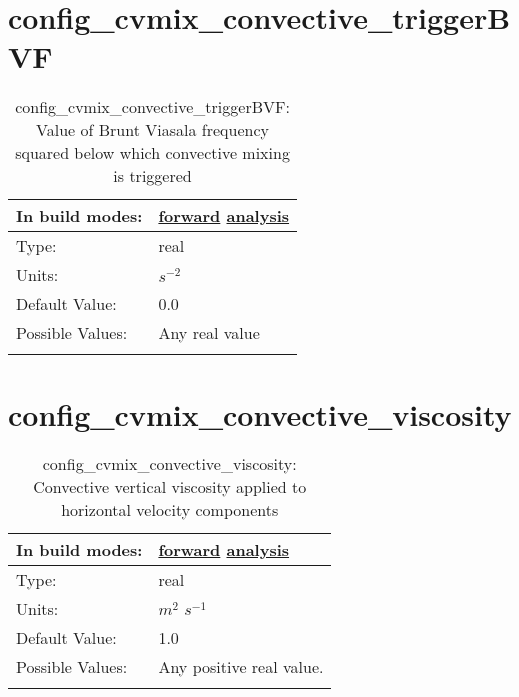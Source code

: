 \section[config\_cvmix\_convective\_triggerBVF]{config\_cvmix\_convective\_triggerBVF}
\label{sec:nm_sec_config_cvmix_convective_triggerBVF}
\begin{center}
\begin{longtable}{| p{2.0in} || p{4.0in} |}
    \hline
    In build modes: & \hyperref[subsec:forward_nm_tab_cvmix]{forward} \hyperref[subsec:analysis_nm_tab_cvmix]{analysis} \\
    \hline
    Type: & real \\
    \hline
    Units: & $s^{-2}$ \\
    \hline
    Default Value: & 0.0 \\
    \hline
    Possible Values: & Any real value \\
    \hline
    \caption{config\_cvmix\_convective\_triggerBVF: Value of Brunt Viasala frequency squared below which convective mixing is triggered}
\end{longtable}
\end{center}
\section[config\_cvmix\_convective\_viscosity]{config\_cvmix\_convective\_viscosity}
\label{sec:nm_sec_config_cvmix_convective_viscosity}
\begin{center}
\begin{longtable}{| p{2.0in} || p{4.0in} |}
    \hline
    In build modes: & \hyperref[subsec:forward_nm_tab_cvmix]{forward} \hyperref[subsec:analysis_nm_tab_cvmix]{analysis} \\
    \hline
    Type: & real \\
    \hline
    Units: & $m^2$ $s^{-1}$ \\
    \hline
    Default Value: & 1.0 \\
    \hline
    Possible Values: & Any positive real value. \\
    \hline
    \caption{config\_cvmix\_convective\_viscosity: Convective vertical viscosity applied to horizontal velocity components}
\end{longtable}
\end{center}
